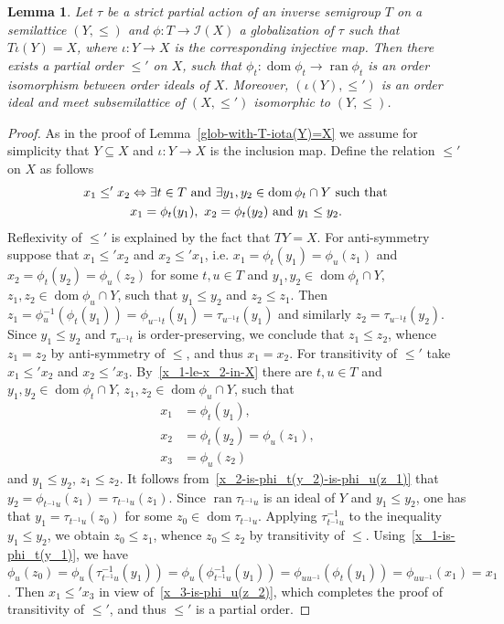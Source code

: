 \documentclass[reqno]{amsart}
\newtheorem{lem}[thrm]{Lemma}
\theoremstyle{definition}
\renewcommand{\iff}{\Leftrightarrow}
\newcommand{\cI}[1]{\mathcal I{(#1)}}
\newcommand{\dom}[1]{\operatorname{\mathrm{dom}}{#1}}
\newcommand{\ran}[1]{\operatorname{\mathrm{ran}}{#1}}
\newcommand{\m}{{}^{-1}}
\newcommand{\0}{\theta}
\newcommand{\io}{\iota}
\newcommand{\sst}{\subseteq}
\begin{document}
\begin{lem}\label{part-order-on-TY}
	Let $\tau$ be a strict partial action of an inverse semigroup $T$ on a semilattice $(Y,\le)$ and $\phi:T\to \cI X$ a globalization of $\tau$ such that $T\io(Y)=X$, where $\io:Y\to X$ is the corresponding injective map. Then there exists a partial order $\le'$ on $X$, such that $\phi_t:\dom{\phi_t}\to\ran{\phi_t}$ is an order isomorphism between order ideals of $X$. Moreover, $(\io(Y),\le')$ is an order ideal and meet subsemilattice of $(X,\le')$ isomorphic to $(Y,\le)$.
\end{lem}
\begin{proof}
	As in the proof of Lemma~\ref{glob-with-T-iota(Y)=X} we assume for simplicity that $Y\sst X$ and $\io:Y\to X$ is the inclusion map. Define the relation $\le'$ on $X$ as follows
	\begin{align}\label{x_1-le-x_2-in-X}
	x_1\le' x_2&\iff\exists t\in T\mbox{ and }\exists y_1,y_2\in\dom{\phi_t}\cap Y\mbox{ such that }\notag\\
	&x_1=\phi_t(y_1),\ x_2=\phi_t(y_2)\mbox{ and }y_1\le y_2.
	\end{align}
	Reflexivity of $\le'$ is explained by the fact that $TY=X$. For anti-symmetry suppose that $x_1\le' x_2$ and $x_2\le' x_1$, i.e. $x_1=\phi_t(y_1)=\phi_u(z_1)$ and $x_2=\phi_t(y_2)=\phi_u(z_2)$ for some $t,u\in T$ and $y_1,y_2\in\dom{\phi_t}\cap Y$, $z_1,z_2\in \dom{\phi_u}\cap Y$, such that $y_1\le y_2$ and $z_2\le z_1$. Then $z_1=\phi\m_u(\phi_t(y_1))=\phi_{u\m t}(y_1)=\tau_{u\m t}(y_1)$ and similarly $z_2=\tau_{u\m t}(y_2)$. Since $y_1\le y_2$ and $\tau_{u\m t}$ is order-preserving, we conclude that $z_1\le z_2$, whence $z_1=z_2$ by anti-symmetry of $\le$, and thus $x_1=x_2$. For transitivity of $\le'$ take $x_1\le' x_2$ and $x_2\le' x_3$. By~\eqref{x_1-le-x_2-in-X} there are $t,u\in T$ and $y_1,y_2\in\dom{\phi_t}\cap Y$, $z_1,z_2\in \dom{\phi_u}\cap Y$, such that 
	\begin{align}
	x_1&=\phi_t(y_1),\label{x_1-is-phi_t(y_1)}\\
	x_2&=\phi_t(y_2)=\phi_u(z_1),\label{x_2-is-phi_t(y_2)-is-phi_u(z_1)}\\
	x_3&=\phi_u(z_2)\label{x_3-is-phi_u(z_2)}
	\end{align}
	and $y_1\le y_2$, $z_1\le z_2$. It follows from~\eqref{x_2-is-phi_t(y_2)-is-phi_u(z_1)} that $y_2=\phi_{t\m u}(z_1)=\tau_{t\m u}(z_1)$. Since $\ran{\tau_{t\m u}}$ is an ideal of $Y$ and $y_1\le y_2$, one has that $y_1=\tau_{t\m u}(z_0)$ for some $z_0\in\dom{\tau_{t\m u}}$. Applying $\tau\m_{t\m u}$ to the inequality $y_1\le y_2$, we obtain $z_0\le z_1$, whence $z_0\le z_2$ by transitivity of $\le$. Using~\eqref{x_1-is-phi_t(y_1)}, we have $\phi_u(z_0)=\phi_u(\tau\m_{t\m u}(y_1))=\phi_u(\phi\m_{t\m u}(y_1))=\phi_{uu\m}(\phi_t(y_1))=\phi_{uu\m}(x_1)=x_1$. Then $x_1\le' x_3$ in view of~\eqref{x_3-is-phi_u(z_2)}, which completes the proof of transitivity of $\le'$, and thus $\le'$ is a partial order.
	

\end{proof}
\end{document}

